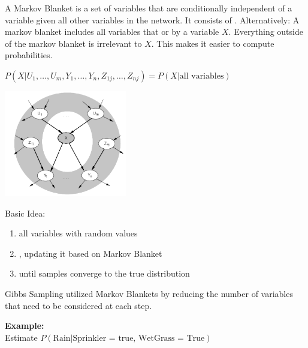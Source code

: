 \documentclass[
../../EiKI_Summary.tex,
]
{subfiles}
\begin{document}
\begin{defbox}
    A Markov Blanket is a set of variables that are conditionally independent of a variable given all other variables in the network. It consists of .
    Alternatively: A markov blanket includes all variables that  or  by a variable $X$. Everything outside of the markov blanket is irrelevant to $X$. This makes it easier to compute probabilities.

    \begin{csmb*}
        $P(X | U_1, \ldots, U_m, Y_1, \ldots, Y_n, Z_{1j}, \ldots, Z_{nj}) = P(X | \text{all variables})$
    \end{csmb*}

    \begin{center}
        \includegraphics[width=0.4\textwidth]{Pics/09/MarkovBlanket.png}
    \end{center}

\end{defbox}

\begin{defbox}
    Basic Idea:
    \begin{enumerate}
        \item {} all variables with random values
        \item {}, updating it based on Markov Blanket
        \item {} until samples converge to the true distribution
    \end{enumerate}

    Gibbs Sampling utilized Markov Blankets by reducing the number of variables that need to be considered at each step.
\end{defbox}

\textbf{Example:}\\
Estimate $P(\text{Rain}|\text{Sprinkler = true, WetGrass = True})$
\end{document}
